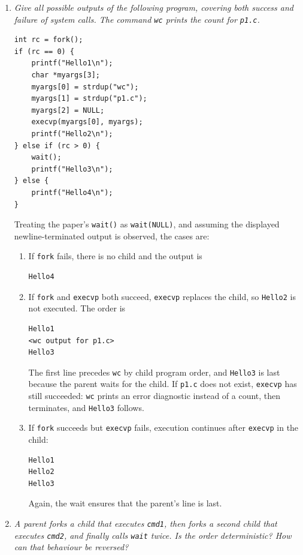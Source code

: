 \begin{enumerate}
\item[(a)] \emph{Give all possible outputs of the following program, covering
both success and failure of system calls.  The command \texttt{wc} prints
the count for \texttt{p1.c}.}

\begin{verbatim}
int rc = fork();
if (rc == 0) {
    printf("Hello1\n");
    char *myargs[3];
    myargs[0] = strdup("wc");
    myargs[1] = strdup("p1.c");
    myargs[2] = NULL;
    execvp(myargs[0], myargs);
    printf("Hello2\n");
} else if (rc > 0) {
    wait();
    printf("Hello3\n");
} else {
    printf("Hello4\n");
}
\end{verbatim}

Treating the paper's \texttt{wait()} as \texttt{wait(NULL)}, and assuming
the displayed newline-terminated output is observed, the cases are:

\begin{enumerate}
\item If \texttt{fork} fails, there is no child and the output is
\begin{verbatim}
Hello4
\end{verbatim}

\item If \texttt{fork} and \texttt{execvp} both succeed, \texttt{execvp}
replaces the child, so \texttt{Hello2} is not executed.  The order is
\begin{verbatim}
Hello1
<wc output for p1.c>
Hello3
\end{verbatim}
The first line precedes \texttt{wc} by child program order, and
\texttt{Hello3} is last because the parent waits for the child.  If
\texttt{p1.c} does not exist, \texttt{execvp} has still succeeded:
\texttt{wc} prints an error diagnostic instead of a count, then terminates,
and \texttt{Hello3} follows.

\item If \texttt{fork} succeeds but \texttt{execvp} fails, execution
continues after \texttt{execvp} in the child:
\begin{verbatim}
Hello1
Hello2
Hello3
\end{verbatim}
Again, the wait ensures that the parent's line is last.
\end{enumerate}

\item[(b)] \emph{A parent forks a child that executes \texttt{cmd1}, then
forks a second child that executes \texttt{cmd2}, and finally calls
\texttt{wait} twice.  Is the order deterministic?  How can that behaviour
be reversed?}


\end{enumerate}
